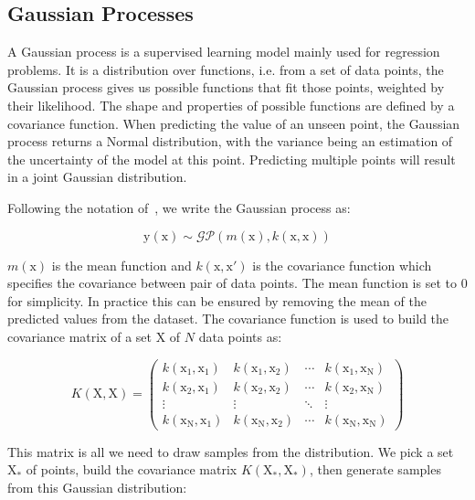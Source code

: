 \subsection{Gaussian Processes}
\label{ssec:gp}

A Gaussian process is a supervised learning model mainly used for regression problems. It is a distribution over functions, i.e. from a set of data points, the Gaussian process gives us possible functions that fit those points, weighted by their likelihood. The shape and properties of possible functions are defined by a covariance function. When predicting the value of an unseen point, the Gaussian process returns a Normal distribution, with the variance being an estimation of the uncertainty of the model at this point. Predicting multiple points will result in a joint Gaussian distribution.

Following the notation of~\textcite{rasmussen2005}, we write the Gaussian process as:

\begin{equation}
    \mathrm{y}(\mathrm{x}) \sim \mathcal{GP} \left( m(\mathrm{x}), k(\mathrm{x}, \mathrm{x}) \right)
\end{equation}

$m(\mathrm{x})$ is the mean function and $k(\mathrm{x}, \mathrm{x'})$ is the covariance function which specifies the covariance between pair of data points. The mean function is set to $0$ for simplicity. In practice this can be ensured by removing the mean of the predicted values from the dataset. The covariance function is used to build the covariance matrix of a set $\mathrm{X}$ of $N$ data points as:

\begin{equation}
    K(\mathrm{X}, \mathrm{X}) = 
    \begin{pmatrix}
    k(\mathrm{x_1}, \mathrm{x_1}) & k(\mathrm{x_1}, \mathrm{x_2}) & \cdots & k(\mathrm{x_1}, \mathrm{x_N}) \\
    k(\mathrm{x_2}, \mathrm{x_1}) & k(\mathrm{x_2}, \mathrm{x_2}) & \cdots & k(\mathrm{x_2}, \mathrm{x_N}) \\
    \vdots & \vdots & \ddots & \vdots \\
    k(\mathrm{x_N}, \mathrm{x_1}) & k(\mathrm{x_N}, \mathrm{x_2}) & \cdots & k(\mathrm{x_N}, \mathrm{x_N})
    \end{pmatrix}
\end{equation}

This matrix is all we need to draw samples from the distribution. We pick a set $\mathrm{X_*}$ of points, build the covariance matrix $K(\mathrm{X_*}, \mathrm{X_*})$, then generate samples from this Gaussian distribution:

